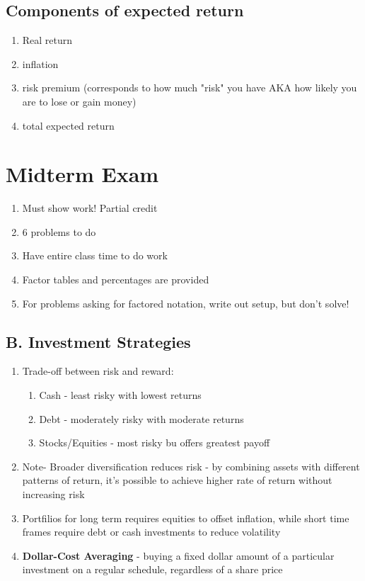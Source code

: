 \documentclass{report} %
\begin{document}
\subsection*{Components of expected return}
\begin{enumerate}
    \item Real return
    \item inflation
    \item risk premium (corresponds to how much "risk" you have AKA how likely you are to lose or gain money)
    \item total expected return
\end{enumerate}

\section*{Midterm Exam}
\begin{enumerate}
    \item Must show work! Partial credit
    \item 6 problems to do
    \item Have entire class time to do work
    \item Factor tables and percentages are provided
    \item For problems asking for factored notation, write out setup, but don't solve!
\end{enumerate}

\subsection*{B. Investment Strategies}
\begin{enumerate}
    \item Trade-off between risk and reward:
    \begin{enumerate}
        \item Cash - least risky with lowest returns
        \item Debt - moderately risky with moderate returns
        \item Stocks/Equities - most risky bu offers greatest payoff
    \end{enumerate}
    \item Note- Broader diversification reduces risk - by combining assets with different patterns of return, it's possible to achieve higher rate of return without increasing risk
    \item Portfilios for long term requires equities to offset inflation, while short time frames require debt or cash investments to reduce volatility
    \item\textbf{Dollar-Cost Averaging} - buying a fixed dollar amount of a particular investment on a regular schedule, regardless of a share price
\end{enumerate}
\end{document}
